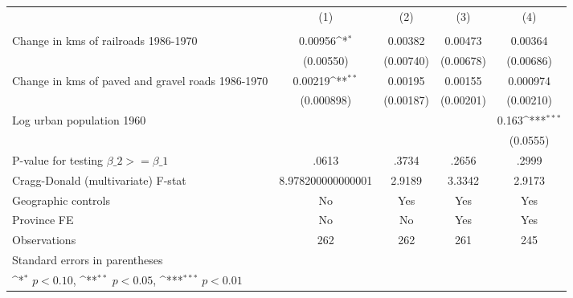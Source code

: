 {
\def\sym#1{\ifmmode^{#1}\else\(^{#1}\)\fi}
\begin{tabular}{l*{4}{c}}
\hline\hline
                &\multicolumn{1}{c}{(1)}&\multicolumn{1}{c}{(2)}&\multicolumn{1}{c}{(3)}&\multicolumn{1}{c}{(4)}\\
                &\multicolumn{1}{c}{}&\multicolumn{1}{c}{}&\multicolumn{1}{c}{}&\multicolumn{1}{c}{}\\
\hline
Change in kms of railroads 1986-1970&  0.00956\sym{*}  &  0.00382         &  0.00473         &  0.00364         \\
                &(0.00550)         &(0.00740)         &(0.00678)         &(0.00686)         \\
[1em]
Change in kms of paved and gravel roads 1986-1970&  0.00219\sym{**} &  0.00195         &  0.00155         & 0.000974         \\
                &(0.000898)         &(0.00187)         &(0.00201)         &(0.00210)         \\
[1em]
Log urban population 1960&                  &                  &                  &    0.163\sym{***}\\
                &                  &                  &                  & (0.0555)         \\
\hline
P-value for testing $\beta\_{2} >= \beta\_{1}$&    .0613         &    .3734         &    .2656         &    .2999         \\
Cragg-Donald (multivariate) F-stat&8.978200000000001         &   2.9189         &   3.3342         &   2.9173         \\
Geographic controls&       No         &      Yes         &      Yes         &      Yes         \\
Province FE     &       No         &       No         &      Yes         &      Yes         \\
Observations    &      262         &      262         &      261         &      245         \\
\hline\hline
\multicolumn{5}{l}{\footnotesize Standard errors in parentheses}\\
\multicolumn{5}{l}{\footnotesize \sym{*} \(p<0.10\), \sym{**} \(p<0.05\), \sym{***} \(p<0.01\)}\\
\end{tabular}
}
